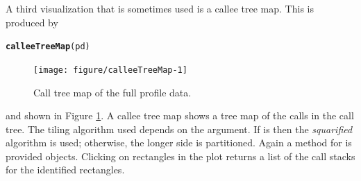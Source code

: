 \documentclass[nojss]{jss}\usepackage[]{graphicx}\usepackage[]{color}
\makeatletter
\newcommand{\hlstd}[1]{\textcolor[rgb]{0.345,0.345,0.345}{#1}}%
\newcommand{\hlkwd}[1]{\textcolor[rgb]{0.737,0.353,0.396}{\textbf{#1}}}%
\newenvironment{kframe}{%
 \def\at@end@of@kframe{}%
 \ifinner\ifhmode%
  \def\at@end@of@kframe{\end{minipage}}%
  \begin{minipage}{\columnwidth}%
 \fi\fi%
 \def\FrameCommand##1{\hskip\@totalleftmargin \hskip-\fboxsep
 \colorbox{shadecolor}{##1}\hskip-\fboxsep
     \hskip-\linewidth \hskip-\@totalleftmargin \hskip\columnwidth}%
 \MakeFramed {\advance\hsize-\width
   \@totalleftmargin\z@ \linewidth\hsize
   \@setminipage}}%
 {\par\unskip\endMakeFramed%
 \at@end@of@kframe}
\newenvironment{knitrout}{}{} %
\makeatother
\begin{document}
A third visualization that is sometimes used is a callee tree map.
This is produced  by
\begin{knitrout}\small
{}\color{fgcolor}\begin{kframe}
\begin{alltt}
\hlkwd{calleeTreeMap}\hlstd{(pd)}
\end{alltt}
\end{kframe}\begin{figure}

{\centering \texttt{[image: figure/calleeTreeMap-1]} 

}

\caption[Call tree map of the full profile data]{Call tree map of the full profile data.}\label{fig:calleeTreeMap}
\end{figure}


\end{knitrout}
and shown in Figure \ref{fig:calleeTreeMap}.  A callee tree map shows
a tree map \citep{ShneidermanTreemaps} of the calls in the call
tree. The tiling algorithm used depends on the 
argument.  If  is  then the
\emph{squarified} algorithm \citep{BrulsVanWijk:sqarified} is used;
otherwise, the longer side is partitioned. Again a method for
 is provided  objects. Clicking on
rectangles in the plot returns a list of the call stacks for the
identified rectangles.
\end{document}
